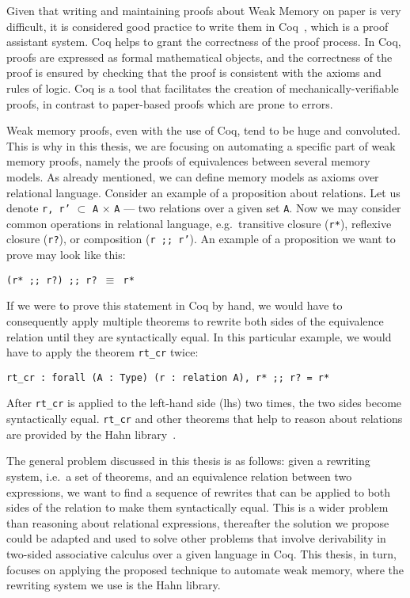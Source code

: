 Given that writing and maintaining proofs about Weak Memory on paper is very difficult, it is considered good practice to write them in Coq~\cite{bertot2013interactive}, which is a proof assistant system. Coq helps to grant the correctness of the proof process. In Coq, proofs are expressed as formal mathematical objects, and the correctness of the proof is ensured by checking that the proof is consistent with the axioms and rules of logic. Coq is a tool that facilitates the creation of mechanically-verifiable proofs, in contrast to paper-based proofs which are prone to errors.

Weak memory proofs, even with the use of Coq, tend to be huge and convoluted. This is why in this thesis, we are focusing on automating a specific part of weak memory proofs, namely the proofs of equivalences between several memory models. As already mentioned, we can define memory models as axioms over relational language. Consider an example of a proposition about relations. Let us denote \texttt{r, r'} $\subset$ \texttt{A} $\times$ \texttt{A} --- two relations over a given set \texttt{A}. Now we may consider common operations in relational language, e.g.\ transitive closure (\texttt{r*}), reflexive closure (\texttt{r?}), or composition (\texttt{r {;;} r'}). An example of a proposition we want to prove may look like this: 
\begin{center}
    \texttt{(r* {;;} r?) {;;} r? $\equiv$ r*}
\end{center}
If we were to prove this statement in Coq by hand, we would have to consequently apply multiple theorems to rewrite both sides of the equivalence relation until they are syntactically equal. In this particular example, we would have to apply the theorem \texttt{rt\_cr} twice: 
\begin{center}
    \texttt{rt\_cr {:} forall (A {:} Type) (r {:} relation A), r* {;;} r? = r*}
\end{center}
After \texttt{rt\_cr} is applied to the left-hand side (lhs) two times, the two sides become syntactically equal. \texttt{rt\_cr} and other theorems that help to reason about relations are provided by the Hahn library~\cite{hahn_lib}. 

The general problem discussed in this thesis is as follows: given a rewriting system, i.e.\ a set of theorems, and an equivalence relation between two expressions, we want to find a sequence of rewrites that can be applied to both sides of the relation to make them syntactically equal. This is a wider problem than reasoning about relational expressions, thereafter the solution we propose could be adapted and used to solve other problems that involve derivability in two-sided associative calculus over a given language in Coq. This thesis, in turn, focuses on applying the proposed technique to automate weak memory, where the rewriting system we use is the Hahn library. 

